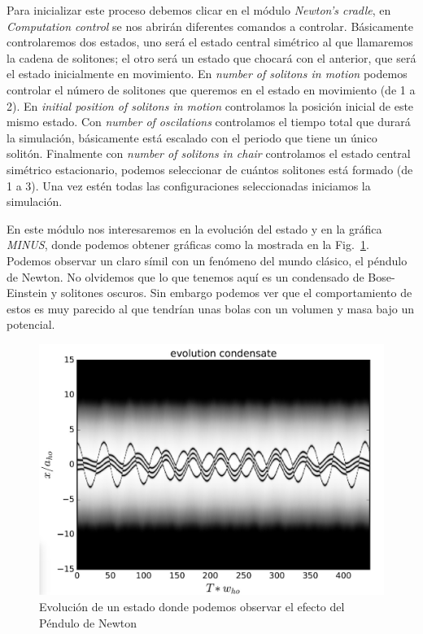 \documentclass[12pt]{article}
\begin{document}
Para inicializar este proceso debemos clicar en el m\'odulo \textit{Newton's cradle}, en \textit{Computation control} se nos abrir\'an diferentes comandos a controlar. B\'asicamente controlaremos dos estados, uno ser\'a el estado central sim\'etrico al que llamaremos la cadena de solitones; el otro ser\'a un estado que chocar\'a con el anterior, que ser\'a el estado inicialmente en movimiento. En \textit{number of solitons in motion} podemos controlar el n\'umero de solitones que queremos en el estado en movimiento (de 1 a 2). En \textit{initial position of solitons in motion} controlamos la posici\'on inicial de este mismo estado. Con \textit{number of oscilations} controlamos el tiempo total que durar\'a la simulaci\'on, b\'asicamente est\'a escalado con el periodo que tiene un \'unico solit\'on. Finalmente con \textit{number of solitons in chair} controlamos el estado central sim\'etrico estacionario, podemos seleccionar de cu\'antos solitones est\'a formado (de 1 a 3). Una vez est\'en todas las configuraciones seleccionadas iniciamos la simulaci\'on. 

En este m\'odulo nos interesaremos en la evoluci\'on del estado y en la gr\'afica \textit{MINUS}, donde podemos obtener gr\'aficas como la mostrada en la Fig.~\ref{Fig:new_crand}. Podemos observar un claro s\'imil con un fen\'omeno del mundo cl\'asico, el p\'endulo de Newton. No olvidemos que lo que tenemos aqu\'i es un condensado de Bose-Einstein y solitones oscuros. Sin embargo podemos ver que el comportamiento de estos es muy parecido al que tendr\'ian unas bolas con un volumen y masa bajo un potencial. 

\begin{figure}[tb]
	\centering
	\includegraphics[width=0.9\linewidth]{new_crand.pdf}
	\caption{Evoluci\'on de un estado donde podemos observar el efecto del P\'endulo de Newton}
	\label{Fig:new_crand}
\end{figure}
\end{document}
